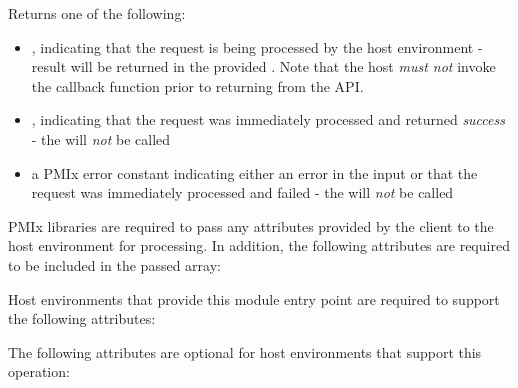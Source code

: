 Returns one of the following:

\begin{itemize}
    \item {}, indicating that the request is being processed by the host environment - result will be returned in the provided . Note that the host \emph{must not} invoke the callback function prior to returning from the \ac{API}.
    \item {}, indicating that the request was immediately processed and returned \textit{success} - the  will \textit{not} be called
    \item a PMIx error constant indicating either an error in the input or that the request was immediately processed and failed - the  will \textit{not} be called
\end{itemize}

\reqattrstart
\ac{PMIx} libraries are required to pass any attributes provided by the client to the host environment for processing. In addition, the following attributes are required to be included in the passed  array:


\divider

Host environments that provide this module entry point are required to support the following attributes:


\reqattrend

\optattrstart
The following attributes are optional for host environments that support this operation:


\optattrend

